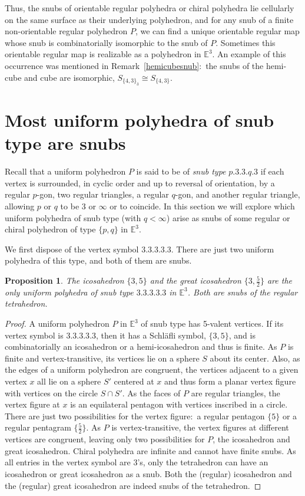 \documentclass[12pt]{article}
\newtheorem{proposition}[theorem]{Proposition}
\theoremstyle{definition}\newtheorem{definition}{Definition}[section]
\begin{document}
Thus, the snubs of orientable regular polyhedra or chiral polyhedra lie cellularly on the same surface as their underlying polyhedron, and for any snub of a finite non-orientable regular polyhedron $P$, we can find a unique orientable regular map whose snub is combinatorially isomorphic to the snub of $P$. Sometimes this orientable regular map is realizable as a polyhedron in $\mathbb{E}^3$. An example of this occurrence was mentioned in Remark~\ref{hemicubesnub}:\ the snubs of the hemi-cube and cube are isomorphic, $S_{\{4,3\}_3} \cong S_{\{4,3\}}$.
\smallskip

\section{Most uniform polyhedra of snub type are snubs} 
\label{completenessarguments}

Recall that a uniform polyhedron $P$ is said to be of \textit{snub type} $p.3.3.q.3$ if each vertex is surrounded, in cyclic order and up to reversal of orientation, by a regular $p$-gon, two regular triangles, a regular $q$-gon, and another regular triangle, allowing $p$ or $q$ to be 3 or $\infty$ or to coincide. In this section we will explore which uniform polyhedra of snub type (with $q<\infty$) arise as snubs of some regular or chiral polyhedron of type $\{p,q\}$ in $\mathbb{E}^3$. \smallskip

We first dispose of the vertex symbol $3.3.3.3.3$. There are just two uniform polyhedra of this type, and both of them are snubs.

\begin{proposition}
\label{all3}
The icosahedron $\{3,5\}$ and the great icosahedron $\{3,\frac{5}{2}\}$ are the only uniform polyhedra of snub type $3.3.3.3.3$ in $\mathbb{E}^3$. Both are snubs of the regular tetrahedron. 
\end{proposition}

\begin{proof}
A uniform polyhedron $P$ in $\mathbb{E}^3$ of snub type has 5-valent vertices. If its vertex symbol is $3.3.3.3.3$, then it has a 
Schl\"afli symbol, $\{3,5\}$, and is combinatorially an icosahedron or a hemi-icosahedron and thus is finite. As $P$ is finite and vertex-transitive, its vertices lie on a sphere $S$ about its center. Also, as the edges of a uniform polyhedron are congruent, the vertices adjacent to a given vertex $x$ all lie on a sphere $S'$ centered at $x$ and thus form a planar vertex figure with vertices on the circle $S\cap S'$. As the faces of $P$ are regular triangles, the vertex figure at $x$ is an equilateral pentagon with vertices inscribed in a circle. There are just two possibilities for the vertex figure:\ a regular pentagon $\{5\}$ or a regular pentagram $\{\frac{5}{2}\}$. As $P$ is vertex-transitive, the vertex figures at different vertices are congruent, leaving only two possibilities for $P$, the icosahedron and great icosahedron. Chiral polyhedra are infinite and cannot have finite snubs. As all entries in the vertex symbol are $3$'s, only the tetrahedron can have an icosahedron or great icosahedron as a snub. Both the (regular) icosahedron and the (regular) great icosahedron are indeed snubs of the tetrahedron.
\end{proof}
\smallskip
\end{document}
